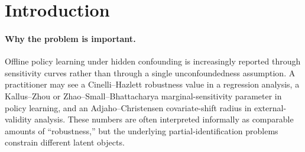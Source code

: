 \documentclass[11pt]{article}
\theoremstyle{definition}
\theoremstyle{plain}
\theoremstyle{remark}
\begin{document}
\begin{abstract}
Sensitivity analyses for hidden confounding now use several incompatible languages: Cinelli--Hazlett partial-$R^2$ budgets, marginal-sensitivity odds-ratio budgets, and covariate-shift ambiguity sets.  This proposal asks when those languages can be calibrated to give the same robust policy-regret comparison over a finite offline policy class.  The routine piece is a support-function reduction: after local compatibility normalization, the three regret endpoints are different support functions of the same policy score.  The flagship conjecture is an observable all-pairs equivalence frontier for the local population criteria induced by the MSM robust-welfare objective in \citet{JinXuZhengZhou2025} and the covariate-shift policy-choice objective in \citet{AdjahoChristensen2025}: positive scalar bridges preserve all active robust-regret endpoints exactly when the finite policy-score matrix has a positive common scale across languages, equivalently vanishing cross-language $2\times2$ minors plus nonzero active columns.  Resolving the conjecture would tell policy-learning papers when a reported CH partial-$R^2$ sensitivity value can be a calibrated proxy for an MSM or covariate-shift regret curve, and when separate robustness curves are mathematically unavoidable.
\end{abstract}

\section{Introduction}
\paragraph{Why the problem is important.}
Offline policy learning under hidden confounding is increasingly reported through sensitivity curves rather than through a single unconfoundedness assumption.  A practitioner may see a Cinelli--Hazlett robustness value in a regression analysis, a Kallus--Zhou or Zhao--Small--Bhattacharya marginal-sensitivity parameter in policy learning, and an Adjaho--Christensen covariate-shift radius in external-validity analysis.  These numbers are often interpreted informally as comparable amounts of ``robustness,'' but the underlying partial-identification problems constrain different latent objects.
\end{document}
